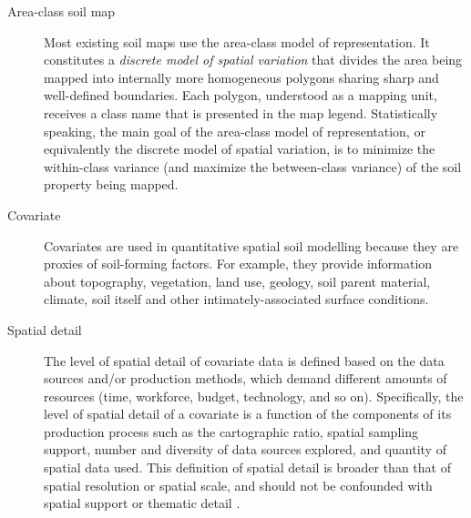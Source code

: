 


\begin{description}
 \item[Area-class soil map] Most existing soil maps use the area-class model of representation. It 
 constitutes a \emph{discrete model of spatial variation} that divides the area being mapped into 
 internally more homogeneous polygons sharing sharp and well-defined boundaries. Each polygon, 
 understood as a mapping unit, receives a class name that is presented in the map legend. 
 Statistically speaking, the main goal of the area-class model of representation, or equivalently 
 the discrete model of spatial variation, is to minimize the within-class variance (and maximize 
 the between-class variance) of the soil property being mapped.
 
 \item[Covariate] Covariates are used in quantitative spatial soil modelling because they are 
 proxies of soil-forming factors. For example, they provide information about topography, 
 vegetation, land use, geology, soil parent material, climate, soil itself and other 
 intimately-associated surface conditions.
 
 \item[Spatial detail] The level of spatial detail of covariate data is defined based on the data 
 sources and/or production methods, which demand different amounts of resources (time, workforce, 
 budget, technology, and so on). Specifically, the level of spatial detail of a covariate is a 
 function of the components of its production process such as the cartographic ratio, spatial 
 sampling support, number and diversity of data sources explored, and quantity of spatial data used. 
 This definition of spatial detail is broader than that of spatial resolution or spatial scale, and 
 should not be confounded with spatial support \cite{WebsterEtAl2007} or thematic detail 
 \cite{Rossiter2000}.
\end{description}
